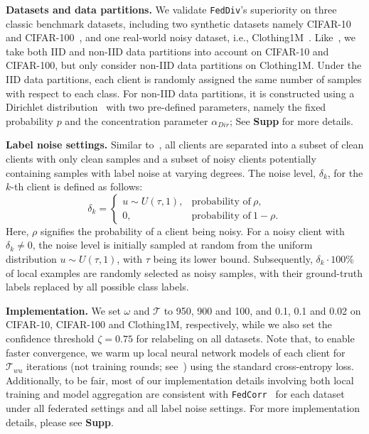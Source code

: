 \documentclass[letterpaper]{article} %
\begin{document}
\noindent
\textbf{Datasets and data partitions.}
We validate \texttt{FedDiv}'s superiority on three classic benchmark datasets, including two synthetic datasets namely CIFAR-10~\cite{cifar} and CIFAR-100~\cite{cifar}, and one real-world noisy dataset, i.e., Clothing1M~\cite{clothing1m}.
Like~\cite{xu2022fedcorr}, we take both IID and non-IID data partitions into account on CIFAR-10 and CIFAR-100, but only consider non-IID data partitions on Clothing1M. Under the IID data partitions, each client is randomly assigned the same number of samples with respect to each class. For non-IID data partitions, it is constructed using a Dirichlet distribution~\cite{lin2020ensemble} with two pre-defined parameters, namely the fixed probability $p$ and the concentration parameter $\alpha_{Dir}$; See \textbf{Supp} for more details.

\noindent
\textbf{Label noise settings.}
Similar to~\cite{xu2022fedcorr}, all clients are separated into a subset of clean clients with only clean samples and a subset of noisy clients potentially containing samples with label noise at varying degrees. The noise level, ${\delta}_{k}$, for the $k$-th client is defined as follows:
\begin{equation}
    \label{Equation:Noise}
    {\delta}_{k} =
    \begin{cases}
        u \sim U(\tau, 1),  & \text{probability of}~\rho, \\
        0, &  \text{probability of}~1-\rho.
    \end{cases}
\end{equation}
Here, $\rho$ signifies the probability of a client being noisy. For a noisy client with ${\delta}_{k}\ne0$, the noise level is initially sampled at random from the uniform distribution $u \sim U(\tau, 1)$, with $\tau$ being its lower bound. Subsequently, ${\delta}_{k} \cdot 100\%$ of local examples are randomly selected as noisy samples, with their ground-truth labels replaced by all possible class labels.

\noindent
\textbf{Implementation.}
We set $\omega$ and $\mathcal{T}$ to 950, 900 and 100, and 0.1, 0.1 and 0.02 on CIFAR-10, CIFAR-100 and Clothing1M, respectively, while we also set the confidence threshold $\zeta=0.75$ for relabeling on all datasets. Note that, to enable faster convergence, we warm up local neural network models of each client for $\mathcal{T}_{wu}$ iterations (not training rounds; see~\cite{xu2022fedcorr}) using the standard cross-entropy loss. Additionally, to be fair, most of our implementation details involving both local training and model aggregation are consistent with \texttt{FedCorr}~\cite{xu2022fedcorr} for each dataset under all federated settings and all label noise settings. For more implementation details, please see \textbf{Supp}.
\end{document}
